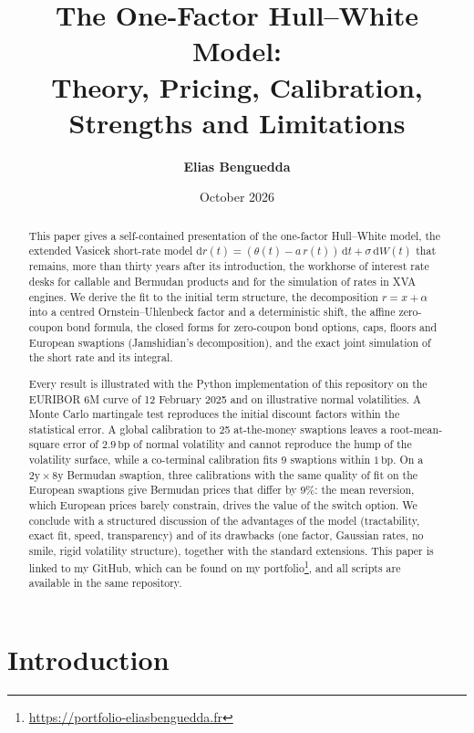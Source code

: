 \documentclass[11pt,a4paper]{article}
\title{\textbf{The One-Factor Hull--White Model:\\
Theory, Pricing, Calibration, Strengths and Limitations}}
\author{\textbf{Elias Benguedda}}
\date{October 2026}
\theoremstyle{plain}
\theoremstyle{definition}
\newcommand{\dd}{\mathrm{d}}
\newcommand{\bp}{\,\mathrm{bp}}
\begin{document}
\maketitle

\begin{abstract}
This paper gives a self-contained presentation of the one-factor Hull--White model, the extended Vasicek short-rate model $\dd r(t)=(\theta(t)-a\,r(t))\,\dd t+\sigma\,\dd W(t)$ that remains, more than thirty years after its introduction, the workhorse of interest rate desks for callable and Bermudan products and for the simulation of rates in XVA engines. We derive the fit to the initial term structure, the decomposition $r=x+\alpha$ into a centred Ornstein--Uhlenbeck factor and a deterministic shift, the affine zero-coupon bond formula, the closed forms for zero-coupon bond options, caps, floors and European swaptions (Jamshidian's decomposition), and the exact joint simulation of the short rate and its integral.

Every result is illustrated with the Python implementation of this repository on the EURIBOR 6M curve of 12 February 2025 and on illustrative normal volatilities. A Monte Carlo martingale test reproduces the initial discount factors within the statistical error. A global calibration to 25 at-the-money swaptions leaves a root-mean-square error of $2.9\bp$ of normal volatility and cannot reproduce the hump of the volatility surface, while a co-terminal calibration fits 9 swaptions within $1\bp$. On a $2\text{y}\times8\text{y}$ Bermudan swaption, three calibrations with the same quality of fit on the European swaptions give Bermudan prices that differ by $9\%$: the mean reversion, which European prices barely constrain, drives the value of the switch option. We conclude with a structured discussion of the advantages of the model (tractability, exact fit, speed, transparency) and of its drawbacks (one factor, Gaussian rates, no smile, rigid volatility structure), together with the standard extensions. This paper is linked to my GitHub, which can be found on my portfolio\footnote{\url{https://portfolio-eliasbenguedda.fr}}, and all scripts are available in the same repository.
\end{abstract}

\clearpage

\tableofcontents
\newpage

\section{Introduction}
\label{sec:intro}
\end{document}

